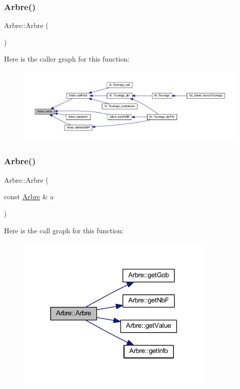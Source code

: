 \subsubsection{\texorpdfstring{Arbre()}{Arbre()}\hspace{0.1cm}{\footnotesize\ttfamily [1/5]}}
{\footnotesize\ttfamily Arbre\+::\+Arbre (\begin{DoxyParamCaption}{ }\end{DoxyParamCaption})}

Here is the caller graph for this function\+:
\nopagebreak
\begin{figure}[H]
\begin{center}
\leavevmode
\includegraphics[width=350pt]{class_arbre_a761f4a2c6a43f44b38d4ac6fc1cf5cae_icgraph}
\end{center}
\end{figure}
\mbox{\label{class_arbre_a3284c47c1ea92a6c5be4a210008dfb4f}} 
\subsubsection{\texorpdfstring{Arbre()}{Arbre()}\hspace{0.1cm}{\footnotesize\ttfamily [2/5]}}
{\footnotesize\ttfamily Arbre\+::\+Arbre (\begin{DoxyParamCaption}\item[{const \hyperlink{class_arbre}{Arbre} \&}]{a }\end{DoxyParamCaption})}

Here is the call graph for this function\+:
\nopagebreak
\begin{figure}[H]
\begin{center}
\leavevmode
\includegraphics[width=269pt]{class_arbre_a3284c47c1ea92a6c5be4a210008dfb4f_cgraph}
\end{center}
\end{figure}
\mbox{\label{class_arbre_ac82e543d8cbf0aced4d741c346f9950d}} 

